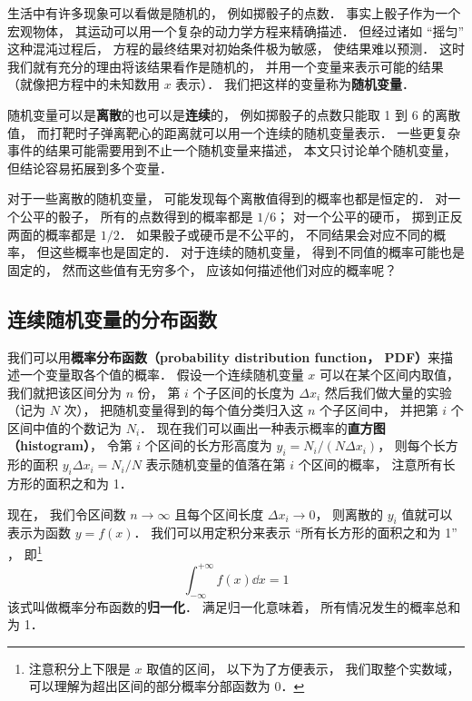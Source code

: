 


生活中有许多现象可以看做是随机的， 例如掷骰子的点数． 事实上骰子作为一个宏观物体， 其运动可以用一个复杂的动力学方程来精确描述． 但经过诸如 “摇匀” 这种混沌过程后， 方程的最终结果对初始条件极为敏感， 使结果难以预测． 这时我们就有充分的理由将该结果看作是随机的， 并用一个变量来表示可能的结果（就像把方程中的未知数用 $x$ 表示）． 我们把这样的变量称为\textbf{随机变量}．

随机变量可以是\textbf{离散}的也可以是\textbf{连续}的， 例如掷骰子的点数只能取 1 到 6 的离散值， 而打靶时子弹离靶心的距离就可以用一个连续的随机变量表示． 一些更复杂事件的结果可能需要用到不止一个随机变量来描述， 本文只讨论单个随机变量， 但结论容易拓展到多个变量．

对于一些离散的随机变量， 可能发现每个离散值得到的概率也都是恒定的． 对一个公平的骰子， 所有的点数得到的概率都是 $1/6$； 对一个公平的硬币， 掷到正反两面的概率都是 $1/2$． 如果骰子或硬币是不公平的， 不同结果会对应不同的概率， 但这些概率也是固定的． 对于连续的随机变量， 得到不同值的概率可能也是固定的， 然而这些值有无穷多个， 应该如何描述他们对应的概率呢？

\subsection{连续随机变量的分布函数}
我们可以用\textbf{概率分布函数（probability distribution function， PDF）}来描述一个变量取各个值的概率． 假设一个连续随机变量 $x$ 可以在某个区间内取值， 我们就把该区间分为 $n$ 份， 第 $i$ 个子区间的长度为 $\Delta x_i$ 然后我们做大量的实验（记为 $N$ 次）， 把随机变量得到的每个值分类归入这 $n$ 个子区间中， 并把第 $i$ 个区间中值的个数记为 $N_i$． 现在我们可以画出一种表示概率的\textbf{直方图（histogram）}， 令第 $i$ 个区间的长方形高度为 $y_i = N_i/(N \Delta x_i)$， 则每个长方形的面积 $y_i \Delta x_i = N_i/N$ 表示随机变量的值落在第 $i$ 个区间的概率， 注意所有长方形的面积之和为 1．


现在， 我们令区间数 $n\to \infty$ 且每个区间长度 $\Delta x_i \to 0$， 则离散的 $y_i$ 值就可以表示为函数 $y = f(x)$． 我们可以用定积分来表示 “所有长方形的面积之和为 1” ， 即\footnote{注意积分上下限是 $x$ 取值的区间， 以下为了方便表示， 我们取整个实数域， 可以理解为超出区间的部分概率分部函数为 0．}
\begin{equation}\label{RandF_eq1}
\int_{-\infty}^{+\infty} f(x)\dd x = 1
\end{equation}
该式叫做概率分布函数的\textbf{归一化}． 满足归一化意味着， 所有情况发生的概率总和为 1．

